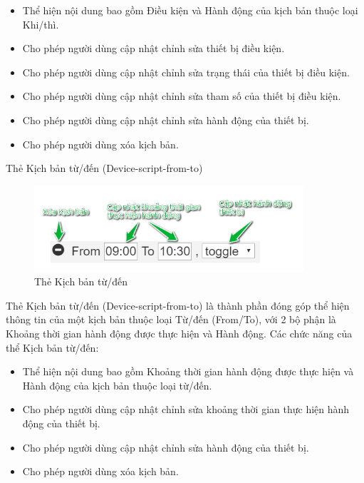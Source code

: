 \documentclass[11pt,a4paper,oneside]{book}
\begin{document}
\begin{itemize}[topsep=1mm,itemsep=-0.5mm]
\item Thể hiện nội dung bao gồm Điều kiện và Hành động của kịch bản thuộc loại Khi/thì.
\item Cho phép người dùng cập nhật chỉnh sửa thiết bị điều kiện.
\item Cho phép người dùng cập nhật chỉnh sửa trạng thái của thiết bị điều kiện.
\item Cho phép người dùng cập nhật chỉnh sửa tham số của thiết bị điều kiện.
\item Cho phép người dùng cập nhật chỉnh sửa hành động của thiết bị.
\item Cho phép người dùng xóa kịch bản.
\vspace{1mm}
\end{itemize}

Thẻ Kịch bản từ/đến (Device-script-from-to)

\begin{figure}[h]
  \centering
     \includegraphics[width=10cm]{6-device-script-from-to}
  \caption{Thẻ Kịch bản từ/đến}\label{fig:6-device-script-from-to}
\end{figure}

Thẻ Kịch bản từ/đến (Device-script-from-to) là thành phần đóng góp thể hiện thông tin của một kịch bản thuộc loại Từ/đến (From/To), với 2 bộ phận là Khoảng thời gian hành động được thực hiện và Hành động. Các chức năng của thể Kịch bản từ/đến:

\begin{itemize}[topsep=1mm,itemsep=-0.5mm]
\item Thể hiện nội dung bao gồm Khoảng thời gian hành động được thực hiện và Hành động của kịch bản thuộc loại từ/đến.
\item Cho phép người dùng cập nhật chỉnh sửa khoảng thời gian thực hiện hành động của thiết bị.
\item Cho phép người dùng cập nhật chỉnh sửa hành động của thiết bị.
\item Cho phép người dùng xóa kịch bản.
\vspace{1mm}
\end{itemize}
\end{document}
